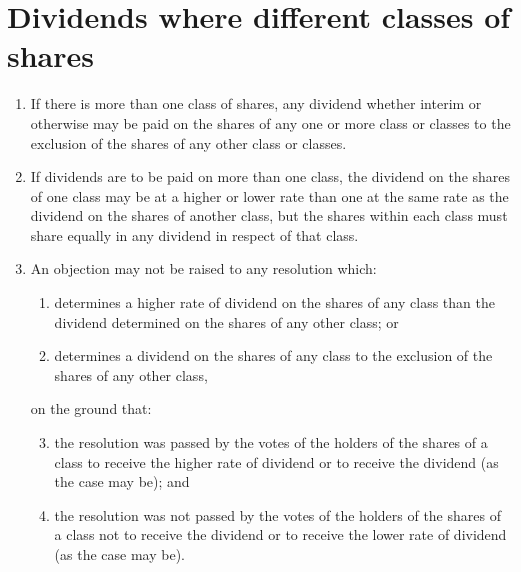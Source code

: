 \section{Dividends where different classes of shares}

\begin{enumerate}[label=(\alph*)]
    \item If there is more than one class of shares, any dividend whether interim or otherwise may be paid on the shares of any one or more class or classes to the exclusion of the shares of any other class or classes.
    
    \item If dividends are to be paid on more than one class, the dividend on the shares of one class may be at a higher or lower rate than one at the same rate as the dividend on the shares of another class, but the shares within each class must share equally in any dividend in respect of that class.
    
    \item An objection may not be raised to any resolution which:
    \begin{enumerate}[label=(\roman*)]
        \item determines a higher rate of dividend on the shares of any class than the dividend determined on the shares of any other class; or
        \item determines a dividend on the shares of any class to the exclusion of the shares of any other class,
    \end{enumerate}
    
    on the ground that:
    
    \begin{enumerate}[label=(\roman*)]
        \setcounter{enumii}{2}
        \item the resolution was passed by the votes of the holders of the shares of a class to receive the higher rate of dividend or to receive the dividend (as the case may be); and
        \item the resolution was not passed by the votes of the holders of the shares of a class not to receive the dividend or to receive the lower rate of dividend (as the case may be).
    \end{enumerate}
\end{enumerate} 